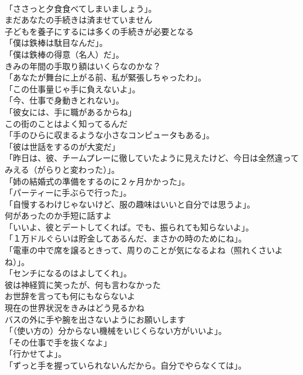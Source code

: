 \documentclass[8pt]{extreport}
\begin{document}
\begin{CJK}{UTF8}{min}
\\	「ささっと夕食食べてしまいましょう」。	
\\	まだあなたの手続きは済ませていません	
\\	子どもを養子にするには多くの手続きが必要となる	
\\	「僕は鉄棒は駄目なんだ」。	
\\	「僕は鉄棒の得意（名人）だ」。	
\\	きみの年間の手取り額はいくらなのかな？	
\\	「あなたが舞台に上がる前、私が緊張しちゃったわ」。	
\\	「この仕事量じゃ手に負えないよ」。	
\\	「今、仕事で身動きとれない」。	
\\	「彼女には、手に職があるからね」	
\\	この街のことはよく知ってるんだ	
\\	「手のひらに収まるような小さなコンピュータもある」。	
\\	「彼は世話をするのが大変だ」	
\\	「昨日は、彼、チームプレーに徹していたように見えたけど、今日は全然違ってみえる（がらりと変わった）」。	
\\	「姉の結婚式の準備をするのに２ヶ月かかった」。	
\\	「パーティーに手ぶらで行った」。	
\\	「自慢するわけじゃないけど、服の趣味はいいと自分では思うよ」。	
\\	何があったのか手短に話すよ	
\\	「いいよ、彼とデートしてくれば。でも、振られても知らないよ」。	
\\	「１万ドルぐらいは貯金してあるんだ、まさかの時のためにね」。	
\\	「電車の中で席を譲るときって、周りのことが気になるよね（照れくさいよね）」。	
\\	「センチになるのはよしてくれ」。	
\\	彼は神経質に笑ったが、何も言わなかった	
\\	お世辞を言っても何にもならないよ	
\\	現在の世界状況をきみはどう見るかね	
\\	バスの外に手や腕を出さないようにお願いします	
\\	「（使い方の）分からない機械をいじくらない方がいいよ」。	
\\	「その仕事で手を抜くなよ」	
\\	「行かせてよ」。 
\\	「ずっと手を握っていられないんだから。自分でやらなくては」。	

\end{CJK}
\end{document}
